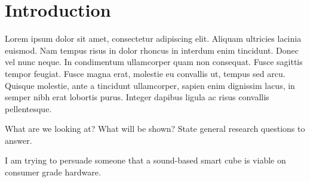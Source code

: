 
\chapter{Introduction} %

\label{Chapter1} %


Lorem ipsum dolor sit amet, consectetur adipiscing elit. Aliquam ultricies lacinia euismod. Nam tempus risus in dolor rhoncus in interdum enim tincidunt. Donec vel nunc neque. In condimentum ullamcorper quam non consequat. Fusce sagittis tempor feugiat. Fusce magna erat, molestie eu convallis ut, tempus sed arcu. Quisque molestie, ante a tincidunt ullamcorper, sapien enim dignissim lacus, in semper nibh erat lobortis purus. Integer dapibus ligula ac risus convallis pellentesque.

What are we looking at? What will be shown? State general research questions to answer.

I am trying to persuade someone that a sound-based smart cube is viable on consumer grade hardware.